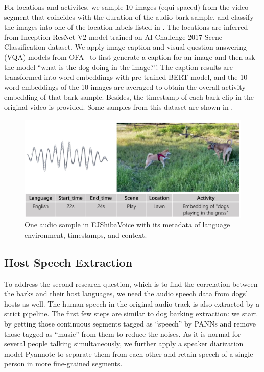 For locations and activites, we sample 10 images (equi-spaced) from the video segment that 
coincides with the duration of the audio bark sample, and classify the images into one of the location labels listed in . The locations are inferred from Inception-ResNet-V2 model\cite{szegedy2017inception} trained on AI Challenge 2017 Scene Classification dataset. We apply image caption and visual question answering (VQA) models from OFA~\cite{wang2022unifying} to first generate a caption for an image and then ask the model ``what is the dog doing in the image?''. The caption results are transformed into word embeddings with pre-trained BERT model\cite{devlin2018bert}, and the 10 word embeddings of the 10 images are averaged to obtain the overall activity embedding of that bark sample. Besides, the timestamp of each bark clip in the original video is provided. Some samples from this dataset are shown in .




\begin{figure}[th]
	\centering
	\includegraphics[width=\columnwidth]{images/sample.jpg}
	\caption{One audio sample in EJShibaVoice with its metadata of language environment, 
timestamps, and context.} 
	\label{fig:EJShiba}
\end{figure}


\subsection{Host Speech Extraction}
\label{sec:speechextraction}
To address the second research question, which is to find
the correlation between the barks and their host languages, 
we need the audio speech data from dogs' hosts as well. 
The human speech in the original audio track is also extracted by a 
strict pipeline. The first few steps are similar to dog barking extraction: 
we start by getting those continuous segments tagged as ``speech'' by PANNs and 
remove those tagged as ``music'' from them to reduce the noises. As it is normal for several people talking simultaneously, we further apply a speaker diarization 
model Pyannote\cite{Bredin2020, Bredin2021} to separate them from each other and retain speech of a single person 
in more fine-grained segments.

